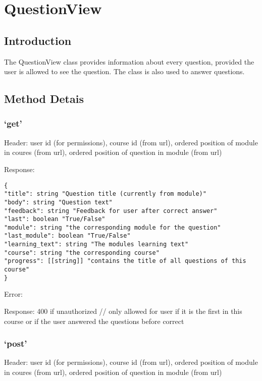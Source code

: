 \chapter*{QuestionView}

\section*{Introduction}\label{introduction}

The QuestionView class provides information about every
question, provided the user is allowed to see the question. The class is
also used to answer questions.

\section*{Method Detais}\label{method-detais}

\subsection*{\texorpdfstring{`get'}{get}}\label{get}

Header: user id (for permissions), course id (from url), ordered
position of module in coures (from url), ordered position of question in
module (from url)

Response:

\begin{verbatim}
{
"title": string "Question title (currently from module)"
"body": string "Question text"
"feedback": string "Feedback for user after correct answer"
"last": boolean "True/False"
"module": string "the corresponding module for the question"
"last_module": boolean "True/False"
"learning_text": string "The modules learning text"
"course": string "the corresponding course"
"progress": [[string]] "contains the title of all questions of this course"
}
\end{verbatim}

Error:

Response: 400 if unauthorized // only allowed for user if it is the
first in this course or if the user answered the questions before
correct

\subsection*{\texorpdfstring{`post'}{post}}\label{post}

Header: user id (for permissions), course id (from url), ordered
position of module in coures (from url), ordered position of question in
module (from url)

